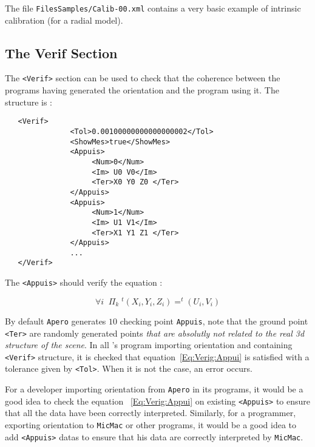 The file {\tt FilesSamples/Calib-00.xml} contains a very basic example of intrinsic
calibration (for a radial model).


\subsection{The Verif Section}

The {\tt  <Verif>} section can be used to check that the coherence between the programs
having generated the orientation and the program using it. The structure is :

\begin{verbatim}
   <Verif>
               <Tol>0.00100000000000000002</Tol>
               <ShowMes>true</ShowMes>
               <Appuis>
                    <Num>0</Num>
                    <Im> U0 V0</Im>
                    <Ter>X0 Y0 Z0 </Ter>
               </Appuis>
               <Appuis>
                    <Num>1</Num>
                    <Im> U1 V1</Im>
                    <Ter>X1 Y1 Z1 </Ter>
               </Appuis>
               ...
   </Verif>
\end{verbatim}

The {\tt <Appuis>} should verify the equation :

\begin{equation}
   \forall i \; \; \Pi_k \;  ^t(X_i,Y_i,Z_i) = ^t(U_i,V_i)   \label{Eq:Verig:Appui}
\end{equation}


By default {\tt Apero} generates $10$ checking point {\tt Appuis}, note that the ground
point {\tt <Ter>} are randomly generated points \emph{that are absolutly not related to
the real 3d structure of the scene}. In all \ELISE's  program importing orientation and containing
{\tt <Verif>} structure, it is checked that equation~\ref{Eq:Verig:Appui} is satisfied with a
tolerance given by {\tt <Tol>}. When it is not the case, an error occurs.

For a developer importing orientation from {\tt Apero} in its programs, it would be a good idea to check
the equation ~\ref{Eq:Verig:Appui} on existing  {\tt <Appuis>} to ensure that all the data
have been correctly interpreted. Similarly, for a programmer, exporting orientation to {\tt MicMac}
or other programs, it would be a good idea  to add {\tt <Appuis>} datas to ensure that his
data are correctly interpreted by  {\tt MicMac}.





